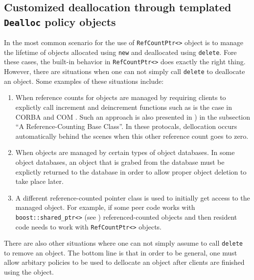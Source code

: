 %
\subsection{Customized deallocation through templated {}\texttt{Dealloc} policy objects}
\label{rcp:sec:dealloc}
%

In the most common scenario for the use of {}\texttt{RefCountPtr<>}
object is to manage the lifetime of objects allocated using
{}\texttt{new} and deallocated using {}\texttt{delete}.  Fore these
cases, the built-in behavior in {}\texttt{RefCountPtr<>} does exactly
the right thing.  However, there are situations when one can not
simply call {}\texttt{delete} to deallocate an object.  Some examples
of these situations include:
%
\begin{enumerate}
\item
When reference counts for objects are managed by requiring clients to
explictly call increment and deincrement functions such as is the case
in CORBA {}\cite{ref:corba} and COM {}\cite{ref:com}.  Such an
approach is also presented in {}\cite[Item 29]{ref:meyers_1996}) in
the subsection ``A Reference-Counting Base Class''.  In these
protocals, dellocation occurs automatically behind the scenes when
this other reference count goes to zero.
\item
When objects are managed by certain types of object databases.  In
some object databases, an object that is grabed from the database must
be explictly returned to the database in order to allow proper object
deletion to take place later.
\item
A different reference-counted pointer class is used to initially get
access to the managed object.  For example, if some peer code works
with {}\texttt{boost::shared\_ptr<>} (see {}\cite{ref:boost})
referenced-counted objects and then resident code needs to work with
{}\texttt{RefCountPtr<>} objects.
\end{enumerate}
%
There are also other situations where one can not simply assume to call
{}\texttt{delete} to remove an object.  The bottom line is that in order
to be general, one must allow arbitary policies to be used to
dellocate an object after clients are finished using the object.

